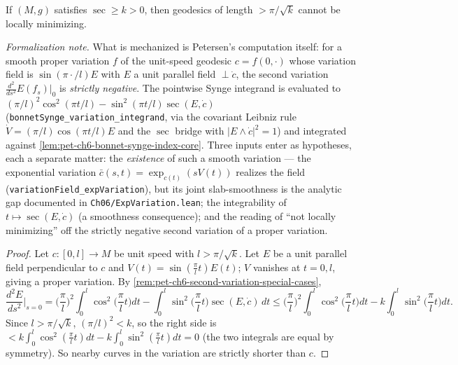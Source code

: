 \begin{lemma}
  \label{lem:pet-ch6-bonnet-synge-diameter}
  \leanok
  If $(M,g)$ satisfies $\sec\ge k>0$, then geodesics of length $>\pi/\sqrt k$
  cannot be locally minimizing.

  \emph{Formalization note.} What is mechanized is Petersen's computation itself: for a smooth
  proper variation $f$ of the unit-speed geodesic $c=f(0,\cdot)$ whose variation field is
  $\sin(\pi\cdot/l)E$ with $E$ a unit parallel field $\perp\dot c$, the second variation
  $\tfrac{d^2}{ds^2}E(f_s)|_{0}$ is \emph{strictly negative}. The pointwise Synge integrand is
  evaluated to $(\pi/l)^2\cos^2(\pi t/l)-\sin^2(\pi t/l)\sec(E,\dot c)$
  (\texttt{bonnetSynge\_variation\_integrand}, via the covariant Leibniz rule
  $\dot V=(\pi/l)\cos(\pi t/l)E$ and the $\sec$ bridge with $|E\wedge\dot c|^2=1$) and
  integrated against \cref{lem:pet-ch6-bonnet-synge-index-core}. Three inputs enter as
  hypotheses, each a separate matter: the \emph{existence} of such a smooth variation — the
  exponential variation $\bar c(s,t)=\exp_{c(t)}(sV(t))$ realizes the field
  (\texttt{variationField\_expVariation}), but its joint slab-smoothness is the analytic gap
  documented in \texttt{Ch06/ExpVariation.lean}; the integrability of $t\mapsto\sec(E,\dot c)$
  (a smoothness consequence); and the reading of ``not locally minimizing'' off the strictly
  negative second variation of a proper variation.
\end{lemma}
\begin{proof}
  Let $c:[0,l]\to M$ be unit speed with $l>\pi/\sqrt k$. Let $E$ be a unit
  parallel field perpendicular to $c$ and $V(t)=\sin(\tfrac\pi lt)E(t)$; $V$
  vanishes at $t=0,l$, giving a proper variation. By
  \cref{rem:pet-ch6-second-variation-special-cases},
  \[
    \frac{d^2E}{ds^2}\bigg|_{s=0}
    =\Big(\frac\pi l\Big)^2\int_0^l\cos^2\Big(\frac\pi lt\Big)dt
    -\int_0^l\sin^2\Big(\frac\pi lt\Big)\sec(E,\dot c)\,dt
    \le\Big(\frac\pi l\Big)^2\int_0^l\cos^2\Big(\frac\pi lt\Big)dt
    -k\int_0^l\sin^2\Big(\frac\pi lt\Big)dt.
  \]
  Since $l>\pi/\sqrt k$, $(\pi/l)^2<k$, so the right side is
  $<k\int_0^l\cos^2(\tfrac\pi lt)dt-k\int_0^l\sin^2(\tfrac\pi lt)dt=0$ (the two
  integrals are equal by symmetry). So nearby curves in the variation are
  strictly shorter than $c$.
\end{proof}


